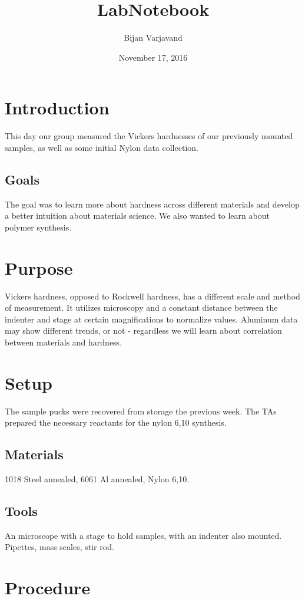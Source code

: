 \documentclass{article}
\author{Bijan Varjavand}
\title{LabNotebook}
\date{November 17, 2016}
\begin{document}
\maketitle

\section{Introduction}

This day our group measured the Vickers hardnesses of our previously mounted samples, as well as some initial Nylon data collection.
\subsection{Goals}

The goal was to learn more about hardness across different materials and develop a better intuition about materials science. We also wanted to learn about polymer synthesis.
\section{Purpose}

Vickers hardness, opposed to Rockwell hardness, has a different scale and method of measurement. It utilizes microscopy and a constant distance between the indenter and stage at certain magnifications to normalize values. Aluminum data may show different trends, or not - regardless we will learn about correlation between materials and hardness.
\section{Setup}

The sample pucks were recovered from storage the previous week. The TAs prepared the necessary reactants for the nylon 6,10 synthesis.
\subsection{Materials}

1018 Steel annealed, 6061 Al annealed, Nylon 6,10.
\subsection{Tools}

An microscope with a stage to hold samples, with an indenter also mounted. Pipettes, mass scales, stir rod.
\section{Procedure}
\end{document}
